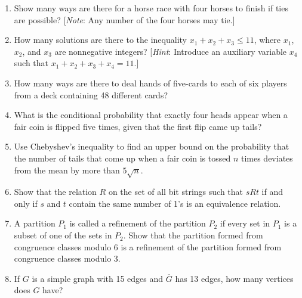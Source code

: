 \documentclass[11pt]{article}
\begin{document}
\begin{enumerate}
    \item Show many ways are there for a horse race with four horses to finish if ties are possible? [\textit{Note}: Any number of the four horses may tie.]
    \item How many solutions are there to the inequality $x_1 + x_2 + x_3 \leq 11$, where $x_1$, $x_2$, and $x_3$ are nonnegative integers? [\textit{Hint}: Introduce an auxiliary variable $x_4$ such that $x_1 + x_2 + x_3 + x_4 = 11$.]
    \item How many ways are there to deal hands of five-cards to each of six players from a deck containing 48 different cards?
    \item What is the conditional probability that exactly four heads appear when a fair coin is flipped five times, given that the first flip came up tails?
    \item Use Chebyshev's inequality to find an upper bound on the probability that the number of tails that come up when a fair coin is tossed $n$ times deviates from the mean by more than $5\sqrt{n}$.
    \item Show that the relation $R$ on the set of all bit strings such that $sRt$ if and only if $s$ and $t$ contain the same number of 1's is an equivalence relation.
    \item A partition $P_1$ is called a refinement of the partition $P_2$ if every set in $P_1$ is a subset of one of the sets in $P_2$. Show that the partition formed from congruence classes modulo 6 is a refinement of the partition formed from congruence classes modulo 3.
    \item If $G$ is a simple graph with 15 edges and $\overline{G}$ has 13 edges, how many vertices does $G$ have?
\end{enumerate}
\end{document}
